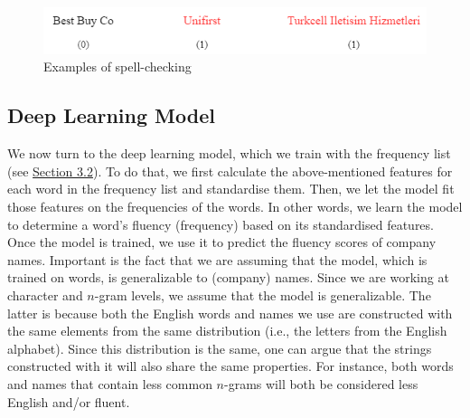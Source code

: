 \documentclass[11pt]{article}
\begin{document}
\vspace{0.5cm}
\begin{figure}[h]
    \centering
    \includegraphics[scale=0.6]{figures/has_errors.png}
    \caption{Examples of spell-checking}
    \label{fig:haserrors}
\end{figure}
\vspace{0.5cm}



\newpage
\subsection{Deep Learning Model}


We now turn to the deep learning model, which we train with the frequency list (see \hyperref[Training set]{Section 3.2}). To do that, we first calculate the above-mentioned features for each word in the frequency list and standardise them. Then, we let the model fit those features on the frequencies of the words. In other words, we learn the model to determine a word's fluency (frequency) based on its standardised features. Once the model is trained, we use it to predict the fluency scores of company names. Important is the fact that we are assuming that the model, which is trained on words, is generalizable to (company) names. Since we are working at character and $n$-gram levels, we assume that the model is generalizable. The latter is because both the English words and names we use are constructed with the same elements from the same distribution (i.e., the letters from the English alphabet). Since this distribution is the same, one can argue that the strings constructed with it will also share the same properties. For instance, both words and names that contain less common $n$-grams will both be considered less English and/or fluent.
\end{document}
